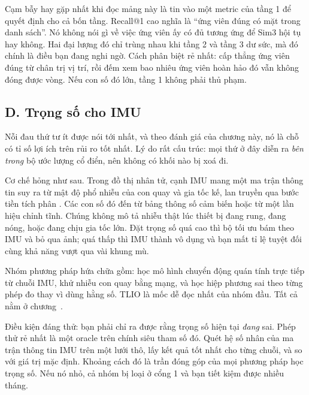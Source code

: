 \documentclass[../../deep_learning.tex]{subfiles}
\begin{document}
\begin{cambay}
Cạm bẫy hay gặp nhất khi đọc mảng này là tin vào một metric của tầng 1 để quyết định cho cả bốn tầng. Recall@1 cao nghĩa là ``ứng viên đúng có mặt trong danh sách''. Nó không nói gì về việc ứng viên ấy có đủ tương ứng để Sim3 hội tụ hay không. Hai đại lượng đó chỉ trùng nhau khi tầng 2 và tầng 3 dư sức, mà đó chính là điều bạn đang nghi ngờ. Cách phân biệt rẻ nhất: cấp thẳng ứng viên đúng từ chân trị vị trí, rồi đếm xem bao nhiêu ứng viên hoàn hảo đó vẫn không đóng được vòng. Nếu con số đó lớn, tầng 1 không phải thủ phạm.
\end{cambay}

\subsection{D. Trọng số cho IMU}
Nỗi đau thứ tư ít được nói tới nhất, và theo đánh giá của chương này, nó là chỗ có tỉ số lợi ích trên rủi ro tốt nhất. Lý do rất cấu trúc: mọi thứ ở đây diễn ra \emph{bên trong} bộ ước lượng cổ điển, nên không có khối nào bị xoá đi.

Cơ chế hỏng như sau. Trong đồ thị nhân tử, cạnh IMU mang một ma trận thông tin suy ra từ mật độ phổ nhiễu của con quay và gia tốc kế, lan truyền qua bước tiền tích phân \cite{forster2017preintegration}. Các con số đó đến từ bảng thông số cảm biến hoặc từ một lần hiệu chỉnh tĩnh. Chúng không mô tả nhiễu thật lúc thiết bị đang rung, đang nóng, hoặc đang chịu gia tốc lớn. Đặt trọng số quá cao thì bộ tối ưu bám theo IMU và bỏ qua ảnh; quá thấp thì IMU thành vô dụng và bạn mất tỉ lệ tuyệt đối cùng khả năng vượt qua vài khung mù.

Nhóm phương pháp hứa chữa gồm: học mô hình chuyển động quán tính trực tiếp từ chuỗi IMU, khử nhiễu con quay bằng mạng, và học hiệp phương sai theo từng phép đo thay vì dùng hằng số. TLIO \cite{liu2020tlio} là mốc dễ đọc nhất của nhóm đầu. Tất cả nằm ở chương~.

Điều kiện đáng thử: bạn phải chỉ ra được rằng trọng số hiện tại \emph{đang} sai. Phép thử rẻ nhất là một oracle trên chính siêu tham số đó. Quét hệ số nhân của ma trận thông tin IMU trên một lưới thô, lấy kết quả tốt nhất cho từng chuỗi, và so với giá trị mặc định. Khoảng cách đó là trần đóng góp của mọi phương pháp học trọng số. Nếu nó nhỏ, cả nhóm bị loại ở cổng 1 và bạn tiết kiệm được nhiều tháng.
\end{document}
